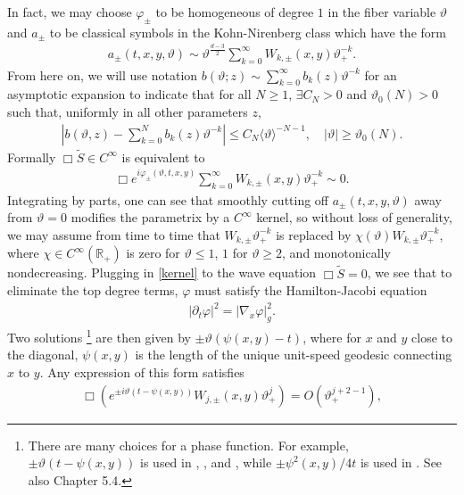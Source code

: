 \documentclass[11pt,letterpaper,oneside]{amsart}
\newcommand{\R}{\mathbb{R}}
\renewcommand{\phi}{\varphi}
\renewcommand{\theta}{\vartheta}
\theoremstyle{definition}
\theoremstyle{remark}
\newcommand{\wt}{\widetilde}
\renewcommand{\d}{\partial}
\theoremstyle{definition}
\theoremstyle{remark}
\begin{document}
In fact, we may choose $\phi_\pm$ to be homogeneous of degree $1$ in the fiber variable $\theta$ and $a_\pm$ to be classical symbols in the Kohn-Nirenberg class which have the form
\begin{align*}
    a_\pm(t,x,y, \theta) \sim \theta^{\frac{d-3}{2}} \sum_{k = 0}^{\infty} W_{k, \pm}(x,y) \theta_+^{-k}.
\end{align*}
From here on, we will use notation $b(\theta; z) \sim \sum_{k = 0}^\infty b_k(z) \theta^{-k}$ for an asymptotic expansion to indicate that for all $N \geq 1$, $\exists C_N > 0$ and $\theta_0(N) > 0$ such that, uniformly in all other parameters $z$,
\begin{align*}
    \left|b(\theta, z) - \sum_{k = 0}^N b_k(z) \theta^{-k} \right| \leq C_N \langle \theta \rangle^{-N - 1}, \quad |\theta| \geq \theta_0(N).
\end{align*}
Formally $\Box \wt S \in C^\infty$ is equivalent to
\begin{align*}
    \Box e^{i \phi_\pm(\theta, t,x,y)} \sum_{k = 0}^\infty W_{k, \pm}(x,y) \theta_+^{-k} \sim 0.
\end{align*}
Integrating by parts, one can see that smoothly cutting off $a_\pm(t, x,y,\theta)$ away from $\theta = 0$ modifies the parametrix by a $C^\infty$ kernel, so without loss of generality, we may assume from time to time that $W_{k, \pm} \theta_+^{-k}$ is replaced by $\chi(\theta) W_{k, \pm} \theta_+^{-k}$, where $\chi \in C^\infty(\R_+)$ is zero for $\theta \leq 1$, $1$ for $\theta \geq 2$, and monotonically nondecreasing. Plugging in \eqref{kernel} to the wave equation $\Box \wt S = 0$, we see that to eliminate the top degree terms, $\phi$ must satisfy the Hamilton-Jacobi equation
\begin{align}\label{eq: HJE}
    |\d_t \phi|^2 = |\nabla_x \phi|_g^2.
\end{align}
Two solutions \footnote{There are many choices for a phase function. For example, $\pm \theta(t - \psi(x,y))$ is used in \cite{MM}, \cite{Vig22}, and \cite{HeZe19}, while $\pm \psi^2(x,y)/4t$ is used in \cite{CdVParametrixOndesIntegraleslEspaceChemins}. See also \cite{GuilleminSternberg-SCA} Chapter 5.4.} are then given by $\pm \theta(\psi(x,y) - t)$, where for $x$ and $y$ close to the diagonal, $\psi(x,y)$ is the length of the unique unit-speed geodesic connecting $x$ to $y$. Any expression of this form satisfies
\begin{align*}
    \Box \left(e^{\pm i \theta (t - \psi(x,y))} W_{j, \pm}(x,y) \theta_+^j\right) = O(\theta_+^{j + 2 - 1}),
\end{align*}
\end{document}
